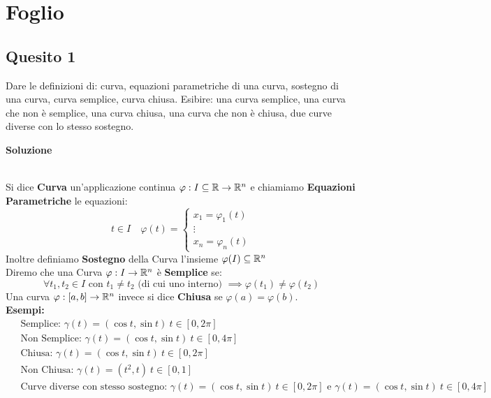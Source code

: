 \chapter{Foglio \ \thechapter}


\section*{Quesito 1}
Dare le definizioni di: curva, equazioni parametriche di una curva, sostegno
di una curva, curva semplice, curva chiusa. Esibire: una curva semplice, una curva che
non è semplice, una curva chiusa, una curva che non è chiusa, due curve diverse con lo
stesso sostegno.

\medskip
\begin{large}
\textbf{Soluzione}
\end{large} \\
Si dice \textbf{Curva} un'applicazione continua $\varphi : I\subseteq \mathbb{R}\to\mathbb{R}^n$
e chiamiamo \textbf{Equazioni Parametriche} le equazioni:
\[
  t\in I \quad \varphi(t)=\left\{\begin{array}{l}
      x_1=\varphi_1(t)\\
      \vdots\\
      x_n=\varphi_n(t)
  \end{array}\right.  
\]
Inoltre definiamo \textbf{Sostegno} della Curva l'insieme $\varphi(I)\subseteq\mathbb{R}^n$\\
Diremo che una Curva $\varphi: I\to\mathbb{R}^n$ è \textbf{Semplice} se:
\[
\forall t_1,t_2\in I \text{ con } t_1\neq t_2 \text{ (di cui uno interno) } \implies \varphi(t_1)\neq\varphi(t_2)  
\]
Una curva $\varphi:[a,b]\to\mathbb{R}^n$ invece si dice \textbf{Chiusa} se $\varphi(a)=\varphi(b)$.\\
\smallskip
\textbf{Esempi:}
\begin{align*}
  &\text{ Semplice: } \gamma(t)=(\cos t, \sin t)\: t\in[0,2\pi]\\
  &\text{ Non Semplice: } \gamma(t)=(\cos t, \sin t)\: t\in[0,4\pi]\\
  &\text{ Chiusa: } \gamma(t)=(\cos t, \sin t)\: t\in[0,2\pi]\\
  &\text{ Non Chiusa: } \gamma(t)=(t^2, t)\: t\in[0,1]\\
  &\text{ Curve diverse con stesso sostegno: } \gamma(t)=(\cos t, \sin t)\: t\in[0,2\pi] \text{ e }\gamma(t)=(\cos t, \sin t)\: t\in[0,4\pi]
\end{align*}


